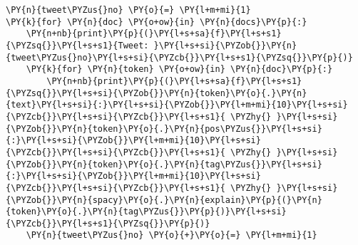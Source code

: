     \begin{tcolorbox}[breakable, size=fbox, boxrule=1pt, pad at break*=1mm,colback=cellbackground, colframe=cellborder]
\begin{Verbatim}[commandchars=\\\{\}]
\PY{n}{tweet\PYZus{}no} \PY{o}{=} \PY{l+m+mi}{1}
\PY{k}{for} \PY{n}{doc} \PY{o+ow}{in} \PY{n}{docs}\PY{p}{:}
    \PY{n+nb}{print}\PY{p}{(}\PY{l+s+sa}{f}\PY{l+s+s1}{\PYZsq{}}\PY{l+s+s1}{Tweet: }\PY{l+s+si}{\PYZob{}}\PY{n}{tweet\PYZus{}no}\PY{l+s+si}{\PYZcb{}}\PY{l+s+s1}{\PYZsq{}}\PY{p}{)}
    \PY{k}{for} \PY{n}{token} \PY{o+ow}{in} \PY{n}{doc}\PY{p}{:}
        \PY{n+nb}{print}\PY{p}{(}\PY{l+s+sa}{f}\PY{l+s+s1}{\PYZsq{}}\PY{l+s+si}{\PYZob{}}\PY{n}{token}\PY{o}{.}\PY{n}{text}\PY{l+s+si}{:}\PY{l+s+si}{\PYZob{}}\PY{l+m+mi}{10}\PY{l+s+si}{\PYZcb{}}\PY{l+s+si}{\PYZcb{}}\PY{l+s+s1}{ \PYZhy{} }\PY{l+s+si}{\PYZob{}}\PY{n}{token}\PY{o}{.}\PY{n}{pos\PYZus{}}\PY{l+s+si}{:}\PY{l+s+si}{\PYZob{}}\PY{l+m+mi}{10}\PY{l+s+si}{\PYZcb{}}\PY{l+s+si}{\PYZcb{}}\PY{l+s+s1}{ \PYZhy{} }\PY{l+s+si}{\PYZob{}}\PY{n}{token}\PY{o}{.}\PY{n}{tag\PYZus{}}\PY{l+s+si}{:}\PY{l+s+si}{\PYZob{}}\PY{l+m+mi}{10}\PY{l+s+si}{\PYZcb{}}\PY{l+s+si}{\PYZcb{}}\PY{l+s+s1}{ \PYZhy{} }\PY{l+s+si}{\PYZob{}}\PY{n}{spacy}\PY{o}{.}\PY{n}{explain}\PY{p}{(}\PY{n}{token}\PY{o}{.}\PY{n}{tag\PYZus{}}\PY{p}{)}\PY{l+s+si}{\PYZcb{}}\PY{l+s+s1}{\PYZsq{}}\PY{p}{)}
    \PY{n}{tweet\PYZus{}no} \PY{o}{+}\PY{o}{=} \PY{l+m+mi}{1}
    
\end{Verbatim}
\end{tcolorbox}

